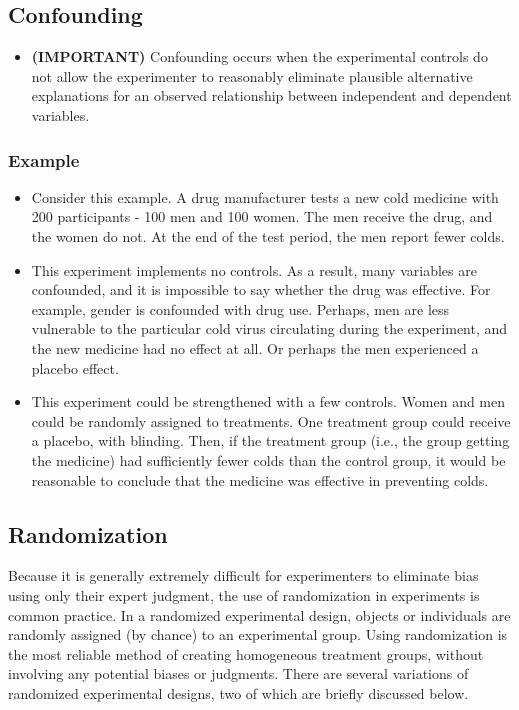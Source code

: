 \documentclass[12pt]{article}
\begin{document}
\newpage
\subsection*{Confounding}
\begin{itemize}
\item \textbf{(IMPORTANT)} Confounding occurs when the experimental controls do not allow the experimenter to reasonably eliminate plausible alternative explanations for an observed relationship between independent and dependent variables.
\end{itemize}

\subsubsection*{Example}
\begin{itemize}
\item Consider this example. A drug manufacturer tests a new cold medicine with 200 participants - 100 men and 100 women. The men receive the drug, and the women do not. At the end of the test period, the men report fewer colds.

\item This experiment implements no controls. As a result, many variables are confounded, and it is impossible to say whether the drug was effective. For example, gender is confounded with drug use. Perhaps, men are less vulnerable to the particular cold virus circulating during the experiment, and the new medicine had no effect at all. Or perhaps the men experienced a placebo effect.

\item This experiment could be strengthened with a few controls. Women and men could be randomly assigned to treatments. One treatment group could receive a placebo, with blinding. Then, if the treatment group (i.e., the group getting the medicine) had sufficiently fewer colds than the control group, it would be reasonable to conclude that the medicine was effective in preventing colds.
\end{itemize}


\subsection*{Randomization}

Because it is generally extremely difficult for experimenters to eliminate bias using only their expert judgment, the use of randomization in experiments is common practice. In a randomized experimental design, objects or individuals are randomly assigned (by chance) to an experimental group. Using randomization is the most reliable method of creating homogeneous treatment groups, without involving any potential biases or judgments. There are several variations of randomized experimental designs, two of which are briefly discussed below.
\end{document}

